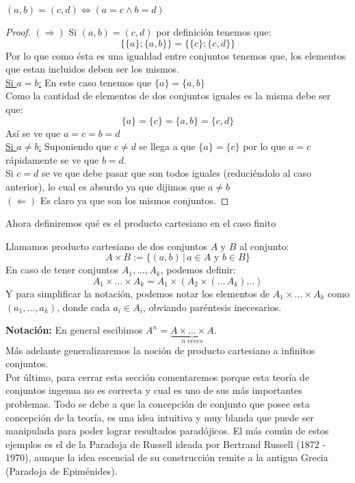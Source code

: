 \documentclass[12pt,a4paper]{book}
\begin{document}
\begin{teo} %
$ (a,b) = (c,d) \Leftrightarrow (a = c \wedge b = d) $
\begin{proof}
$(\Rightarrow)$  Si $(a,b) = (c,d)$ por definición tenemos que:
$$ \{ \{ a \} ; \{ a,b \} \} = \{ \{ c \} ; \{ c,d \} \} $$
Por lo que como ésta es una igualdad entre conjuntos tenemos que, los elementos que estan incluidos deben ser los mismos.\\
\underline{Si $a=b$:} En este caso tenemos que $\lbrace a \rbrace = \lbrace a,b \rbrace$ \\
Como la cantidad de elementos de dos conjuntos iguales es la misma debe ser que: 
$$ \{ a \} = \{ c \} = \{ a,b \} = \{ c,d \}$$
Así se ve que $ a = c = b = d $ \\
\underline{Si $a\neq b$:} Suponiendo que $ c \neq d$ se llega a que $\lbrace a \rbrace = \lbrace c \rbrace$ por lo que $ a = c$ rápidamente se ve que $b = d$.\\
Si $c = d$ se ve que debe pasar que son todos iguales (reduciéndolo al caso anterior), lo cual es absurdo ya que dijimos que $ a \neq b $ \\
$(\Leftarrow)$ Es claro ya que son los mismos conjuntos.
\end{proof}
\end{teo}
 
Ahora definiremos qué es el producto cartesiano en el caso finito

\begin{defi} %
Llamamos producto cartesiano de dos conjuntos $A$ y $B$ al conjunto:
$$ A\times B := \lbrace (a,b) \,\vert\, a \in A \mbox{ y } b \in B \} $$
En caso de tener conjuntos $A_1, \ldots , A_k$, podemos definir:
$$ A_1 \times \ldots \times A_k = A_1 \times ( A_2 \times ( \ldots \, A_k) \ldots )$$
Y para simplificar la notación, podemos notar los elementos de $ A_1 \times \ldots \times A_k$ como $(a_1, \ldots,a_k)$, donde cada $a_i \in A_i$, obviando paréntesis inecesarios.
\end{defi}

\textbf{Notación:} En general escibimos $A^n = \underbrace{A \times \ldots \times A}_ {n \; veces}$.\\[0.5cm]
Más adelante generalizaremos la noción de producto cartesiano a infinitos conjuntos.\\[0.5cm]
Por último, para cerrar esta sección comentaremos porque esta teoría de conjuntos ingenua no es correcta y cual es uno de sus más importantes problemas. Todo se debe a que la concepción de conjunto que posee esta concepción de la teoría, es una idea intuitiva y muy blanda que puede ser manipulada para poder lograr resultados paradójicos. El más común de estos ejemplos es el de la Paradoja de Russell ideada por Bertrand Russell (1872 - 1970), aunque la idea escencial de su construcción remite a la antigua Grecia (Paradoja de Epiménides).\\
\end{document}
